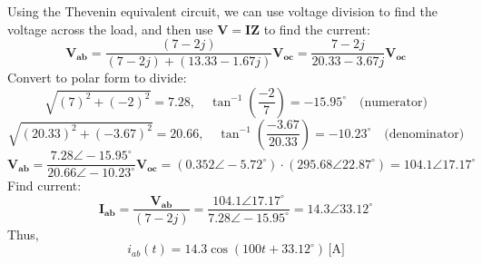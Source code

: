 \documentclass[12pt]{article}
\begin{document}
Using the Thevenin equivalent circuit, we can use voltage division to find the voltage across the load, and then use $\mathbf{V} = \mathbf{IZ}$ to find the current:
\[\mathbf{V_{ab}} = \frac{(7-2j)}{(7-2j) + (13.33 - 1.67j)}\mathbf{V_{oc}} = \frac{7-2j}{20.33 - 3.67j}\mathbf{V_{oc}}\]
Convert to polar form to divide:
\[\sqrt{(7)^2+(-2)^2} = 7.28, \quad \tan^{-1}\left(\frac{-2}{7}\right) = -15.95^\circ\quad \text{(numerator)}\]
\[\sqrt{(20.33)^2+(-3.67)^2} = 20.66, \quad \tan^{-1}\left(\frac{-3.67}{20.33}\right) = -10.23^\circ\quad \text{(denominator)}\]
\[\mathbf{V_{ab}} = \frac{7.28\angle -15.95^\circ}{20.66\angle -10.23^\circ}\mathbf{V_{oc}} = (0.352\angle -5.72^\circ) \cdot (295.68\angle 22.87^\circ) = 104.1\angle 17.17^\circ\]
Find current:
\[\mathbf{I_{ab}} = \frac{\mathbf{V_{ab}}}{(7-2j)} = \frac{104.1\angle 17.17^\circ}{7.28\angle -15.95^\circ} = 14.3\angle 33.12^\circ\]
Thus,
\[\boxed{i_{ab}(t) = 14.3\cos(100t + 33.12^\circ)\,\text{[A]}}\]
\end{document}
